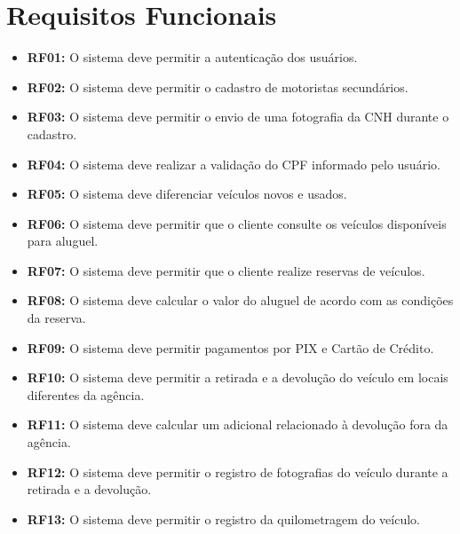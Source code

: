 \documentclass[12pt,a4paper]{report}
\begin{document}
\section{Requisitos Funcionais}
\begin{itemize}

    \item \textbf{RF01:} O sistema deve permitir a autenticação
    dos usuários.

    \item \textbf{RF02:} O sistema deve permitir o cadastro de
    motoristas secundários.

    \item \textbf{RF03:} O sistema deve permitir o envio de uma
    fotografia da CNH durante o cadastro.

    \item \textbf{RF04:} O sistema deve realizar a validação do
    CPF informado pelo usuário.

    \item \textbf{RF05:} O sistema deve diferenciar veículos
    novos e usados.

    \item \textbf{RF06:} O sistema deve permitir que o cliente
    consulte os veículos disponíveis para aluguel.

    \item \textbf{RF07:} O sistema deve permitir que o cliente
    realize reservas de veículos.

    \item \textbf{RF08:} O sistema deve calcular o valor do
    aluguel de acordo com as condições da reserva.

    \item \textbf{RF09:} O sistema deve permitir pagamentos por
    PIX e Cartão de Crédito.

    \item \textbf{RF10:} O sistema deve permitir a retirada e a
    devolução do veículo em locais diferentes da agência.

    \item \textbf{RF11:} O sistema deve calcular um adicional
    relacionado à devolução fora da agência.

    \item \textbf{RF12:} O sistema deve permitir o registro de
    fotografias do veículo durante a retirada e a devolução.

    \item \textbf{RF13:} O sistema deve permitir o registro da
    quilometragem do veículo.


\end{itemize}
\end{document}
